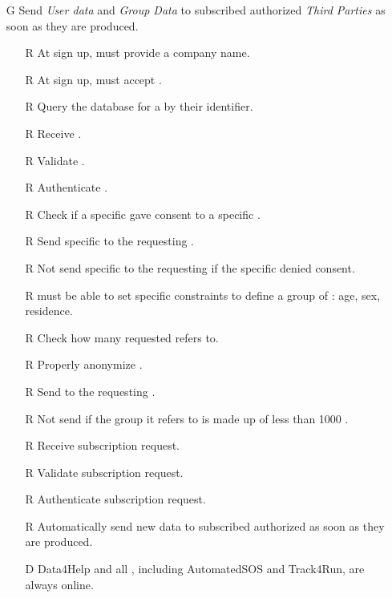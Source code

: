 \documentclass[../../../rasd.tex]{subfiles}
\begin{document}
\begin{itemize}
    \item[G\subs{4}]Send \textit{User data} and \textit{Group Data} to subscribed authorized \textit{Third Parties} as soon as they are produced.
    \begin{itemize}
            \item[R\subs{3}]At sign up,  must provide a company name.
            \item[R\subs{5}]At sign up,  must accept .
        \item[R\subs{7}]Query the database for a  by their identifier.
        \item[R\subs{8}]Receive .
        \item[R\subs{9}]Validate .
        \item[R\subs{10}]Authenticate .
        \item[R\subs{18}]Check if a specific  gave consent to a specific .
        \item[R\subs{19}]Send specific to the requesting .
        \item[R\subs{20}]Not send specific to the requesting  if the specific  denied consent.
        \item[R\subs{21}] must be able to set specific constraints to define a group of : age, sex, residence.
        \item[R\subs{22}]Check how many  requested  refers to.
        \item[R\subs{23}]Properly anonymize .
        \item[R\subs{24}]Send  to the requesting .
        \item[R\subs{25}]Not send  if the group it refers to is made up of less than 1000 .
        \item[R\subs{26}]Receive  subscription request.
        \item[R\subs{27}]Validate  subscription request.
        \item[R\subs{28}]Authenticate  subscription request.
        \item[R\subs{29}]Automatically send new data to subscribed authorized  as soon as they are produced.
        \\
        \item[D\subs{9}]Data4Help and all , including AutomatedSOS and Track4Run, are always online.

\end{itemize}
\end{itemize}
\end{document}
